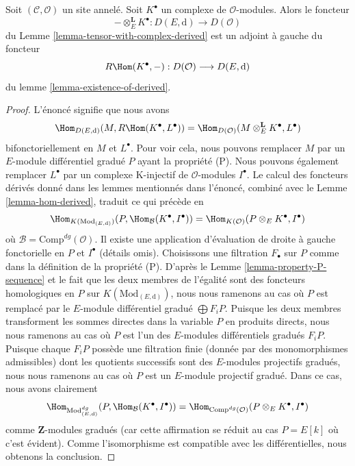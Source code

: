 \begin{lemma}
\label{lemma-tensor-with-complex-hom-adjoint}
Soit $(\mathcal{C}, \mathcal{O})$ un site annelé. Soit $K^\bullet$ un complexe de
$\mathcal{O}$-modules. Alors le foncteur
$$
- \otimes_E^\mathbf{L} K^\bullet :
D(E, \text{d})
\longrightarrow
D(\mathcal{O})
$$
du Lemme \ref{lemma-tensor-with-complex-derived} est un adjoint à gauche du
foncteur
$$
R\Hom(K^\bullet, -) : D(\mathcal{O}) \longrightarrow D(E, \text{d})
$$
du lemme \ref{lemma-existence-of-derived}.
\end{lemma}

\begin{proof}
L'énoncé signifie que nous avons
$$
\Hom_{D(E, \text{d})}(M, R\Hom(K^\bullet, L^\bullet)) =
\Hom_{D(\mathcal{O})}(M \otimes^\mathbf{L}_E K^\bullet, L^\bullet)
$$
bifonctoriellement en $M$ et $L^\bullet$. Pour voir cela, nous pouvons remplacer
$M$ par un $E$-module différentiel gradué $P$ ayant la propriété (P). Nous pouvons
également remplacer $L^\bullet$ par un complexe K-injectif de
$\mathcal{O}$-modules $I^\bullet$. Le calcul des foncteurs dérivés donné dans les
lemmes mentionnés dans l'énoncé, combiné avec le Lemme \ref{lemma-hom-derived},
traduit ce qui précède en
$$
\Hom_{K(\text{Mod}_{(E, \text{d})})}
(P, \Hom_\mathcal{B}(K^\bullet, I^\bullet)) =
\Hom_{K(\mathcal{O})}(P \otimes_E K^\bullet, I^\bullet)
$$
où $\mathcal{B} = \text{Comp}^{dg}(\mathcal{O})$. Il existe une application
d'évaluation de droite à gauche fonctorielle en $P$ et $I^\bullet$ (détails omis).
Choisissons une filtration $F_\bullet$ sur $P$ comme dans la définition de la
propriété (P). D'après le Lemme \ref{lemma-property-P-sequence} et le fait que les
deux membres de l'égalité sont des foncteurs homologiques en $P$ sur
$K(\text{Mod}_{(E, \text{d})})$, nous nous ramenons au cas où $P$ est remplacé par
le $E$-module différentiel gradué $\bigoplus F_iP$. Puisque les deux membres
transforment les sommes directes dans la variable $P$ en produits directs, nous
nous ramenons au cas où $P$ est l'un des $E$-modules différentiels gradués
$F_iP$. Puisque chaque $F_iP$ possède une filtration finie (donnée par des
monomorphismes admissibles) dont les quotients successifs sont des $E$-modules projectifs gradués,
nous nous ramenons au cas où $P$ est un $E$-module projectif gradué. Dans ce cas, nous
avons clairement
$$
\Hom_{\text{Mod}^{dg}_{(E, \text{d})}}
(P, \Hom_\mathcal{B}(K^\bullet, I^\bullet)) =
\Hom_{\text{Comp}^{dg}(\mathcal{O})}(P \otimes_E K^\bullet, I^\bullet)
$$
comme $\mathbf{Z}$-modules gradués (car cette affirmation se réduit au cas $P =
E[k]$ où c'est évident). Comme l'isomorphisme est compatible avec les
différentielles, nous obtenons la conclusion.
\end{proof}

